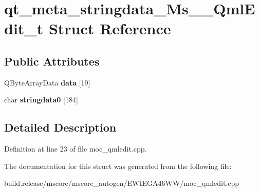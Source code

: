 \hypertarget{structqt__meta__stringdata___ms_____qml_edit__t}{}\section{qt\+\_\+meta\+\_\+stringdata\+\_\+\+Ms\+\_\+\+\_\+\+Qml\+Edit\+\_\+t Struct Reference}
\label{structqt__meta__stringdata___ms_____qml_edit__t}
\subsection*{Public Attributes}
\begin{DoxyCompactItemize}
\item 
\mbox{\label{structqt__meta__stringdata___ms_____qml_edit__t_a3811a53dfa4ecf8d7a3cbed5ee8178c5}} 
Q\+Byte\+Array\+Data {\bfseries data} \mbox{[}19\mbox{]}
\item 
\mbox{\label{structqt__meta__stringdata___ms_____qml_edit__t_ae55d0a81e0c8204d3fe13f11b94279ae}} 
char {\bfseries stringdata0} \mbox{[}184\mbox{]}
\end{DoxyCompactItemize}


\subsection{Detailed Description}


Definition at line 23 of file moc\+\_\+qmledit.\+cpp.



The documentation for this struct was generated from the following file\+:\begin{DoxyCompactItemize}
\item 
build.\+release/mscore/mscore\+\_\+autogen/\+E\+W\+I\+E\+G\+A46\+W\+W/moc\+\_\+qmledit.\+cpp\end{DoxyCompactItemize}

